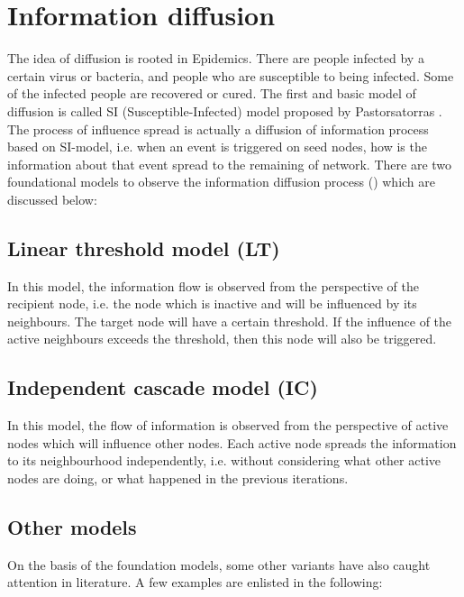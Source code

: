 	\section{Information diffusion}
	\label{sec:domain-diffusion-models}
	The idea of diffusion is rooted in Epidemics. There are people infected by a certain virus or bacteria, and people who are susceptible to being infected. Some of the infected people are recovered or cured. The first and basic model of diffusion is called SI (Susceptible-Infected) model proposed by Pastorsatorras \cite{pastor2001}. The process of influence spread is actually a diffusion of information process based on SI-model, i.e. when an event is triggered on seed nodes, how is the information about that event spread to the remaining of network. There are two foundational models to observe the information diffusion process (\cite{domingos2001,richardson2002,goldenberg2001}) which are discussed below:
	
		\subsection{Linear threshold model (LT)}
		In this model, the information flow is observed from the perspective of the recipient node, i.e. the node which is inactive and will be influenced by its neighbours. The target node will have a certain threshold. If the influence of the active neighbours exceeds the threshold, then this node will also be triggered.

		\subsection{Independent cascade model (IC)}
		In this model, the flow of information is observed from the perspective of active nodes which will influence other nodes. Each active node spreads the information to its neighbourhood independently, i.e. without considering what other active nodes are doing, or what happened in the previous iterations.
		
		\subsection{Other models}
		On the basis of the foundation models, some other variants have also caught attention in literature. A few examples are enlisted in the following:
		
